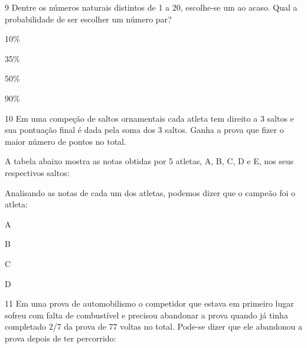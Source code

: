 \num{9} Dentre os números naturais distintos de 1 a 20, escolhe-se um ao
acaso. Qual a probabilidade de ser escolher um número par?

\begin{escolha}
\item
  10\%
\item
  35\%
\item
  50\%
\item
  90\%
\end{escolha}


\num{10} Em uma compeção de saltos ornamentais cada atleta tem direito a 3
saltos e sua pontuação final é dada pela soma dos 3 saltos. Ganha a
prova que fizer o maior número de pontos no total.

A tabela abaixo mostra as notas obtidas por 5 atletas, A, B, C, D e E,
nos seus respectivos saltos:


Analisando as notas de cada um dos atletas, podemos dizer que o campeão
foi o atleta:

\begin{escolha}
\item
  A
\item
  B
\item
  C
\item
  D
\end{escolha}


\num{11} Em uma prova de automobilismo o competidor que estava em primeiro
lugar sofreu com falta de combustível e precisou abandonar a prova
quando já tinha completado 2/7 da prova de 77 voltas no total. Pode-se
dizer que ele abandonou a prova depois de ter percorrido:

